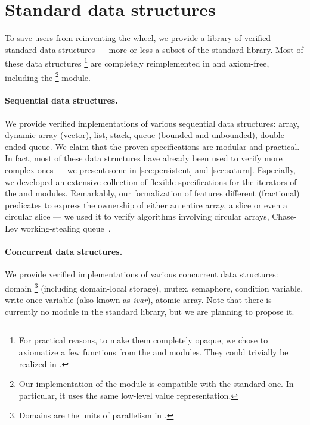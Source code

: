 \section{Standard data structures}
\label{sec:std}

To save users from reinventing the wheel, we provide a library of verified standard data structures --- more or less a subset of the \OCaml standard library.
Most of these data structures%
\footnote{
For practical reasons, to make them completely opaque, we chose to axiomatize a few functions from the  and  modules.
They could trivially be realized in \Zoo.
}
are completely reimplemented in \Zoo and axiom-free, including the %
\footnote{
Our implementation of the  module is compatible with the standard one.
In particular, it uses the same low-level value representation.
}
module.

\paragraph{Sequential data structures.}

We provide verified implementations of various sequential data structures: array, dynamic array (vector), list, stack, queue (bounded and unbounded), double-ended queue.
We claim that the proven specifications are modular and practical.
In fact, most of these data structures have already been used to verify more complex ones --- we present some in \cref{sec:persistent} and \cref{sec:saturn}.
Especially, we developed an extensive collection of flexible specifications for the iterators of the  and  modules.
Remarkably, our formalization of  features different (fractional) predicates to express the ownership of either an entire array, a slice or even a circular slice --- we used it to verify algorithms involving circular arrays, \eg Chase-Lev working-stealing queue~\citep{DBLP:conf/spaa/ChaseL05}.

\paragraph{Concurrent data structures.}

We provide verified implementations of various concurrent data structures: domain%
\footnote{
Domains are the units of parallelism in \OCamlFive.
}
(including domain-local storage), mutex, semaphore, condition variable, write-once variable (also known as \emph{ivar}), atomic array.
Note that there is currently no  module in the \OCaml standard library, but we are planning to propose it.
